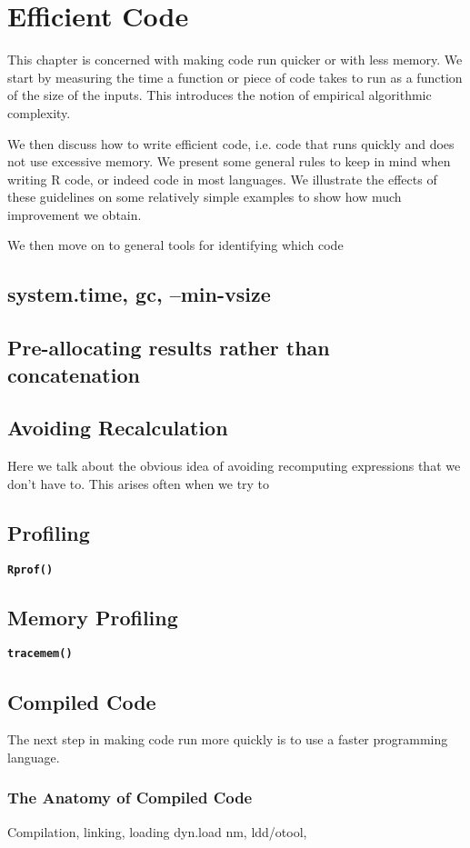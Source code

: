 \documentclass[11pt]{book}
\def\env#1{\texttt{#1}}
\def\Rfunc#1{\textbf{\texttt{#1()}}}
\begin{document}
\chapter{Efficient Code}
This chapter is concerned with making code run quicker or with less
memory.  We start by measuring the time a function or piece of code
takes to run as a function of the size of the inputs.  This introduces
the notion of empirical algorithmic complexity.

We then discuss how to write efficient code, i.e. code
that runs quickly and does not use excessive memory.  We present some
general rules to keep in mind when writing R code, or indeed code in
most languages.  We illustrate the effects of these guidelines on some
relatively simple examples to show how much improvement we obtain. 

We then move on to general tools for identifying which code

 \section{system.time, gc, --min-vsize}
 \section{Pre-allocating results rather than concatenation}
 \section{Avoiding Recalculation}
   Here we talk about the obvious idea of avoiding recomputing
   expressions that we don't have to. This arises often when we 
   try to 
 \section{Profiling}
   \Rfunc{Rprof}
 \section{Memory Profiling}
   \Rfunc{tracemem}

\section{Compiled Code}
 The next step in making code run more quickly is to use a faster
 programming language.

 \subsection{The Anatomy of Compiled Code}
  Compilation, linking, loading
  dyn.load
  nm, ldd/otool, %
\end{document}
